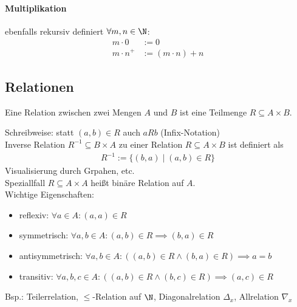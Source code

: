 \paragraph{Multiplikation} ebenfalls rekursiv definiert $\forall m,n \in \N$:
\begin{align*}
	m\cdot0    & := 0           \\
	m\cdot n^+ & :=(m\cdot n)+n
\end{align*}
\subsection{Relationen}
\begin{definition}
	Eine Relation zwischen zwei Mengen $A$ und $B$ ist eine Teilmenge $R\subseteq A\times B$.
\end{definition}
Schreibweise: statt $(a,b) \in R$ auch $aRb$ (Infix-Notation)\\
Inverse Relation $R^{-1}\subseteq B \times A$ zu einer Relation $R\subseteq A \times B$ ist definiert als
\begin{align*}
	R^{-1} := \{(b,a)\mid (a,b)\in R\}
\end{align*}
Visualisierung durch Grpahen, etc.\\
Speziallfall $R\subseteq A\times A$ heißt binäre Relation auf $A$.\\
Wichtige Eigenschaften:
\begin{itemize}
	\item reflexiv: $\forall a \in A: (a,a)\in R$
	\item symmetrisch: $\forall a,b \in A: (a,b)\in R \implies (b,a) \in R$
	\item antisymmetrisch: $\forall a,b \in A: ((a,b) \in R \land (b,a)\in R) \implies
		      a=b$
	\item transitiv: $\forall a,b,c \in A: ((a,b)\in R \land (b,c) \in R)\implies
		      (a,c)\in R$
\end{itemize}
\begin{example}
	Bsp.: Teilerrelation, $\leq$-Relation auf $\N$, Diagonalrelation $\Delta_x$, Allrelation $\nabla_x$
\end{example}
